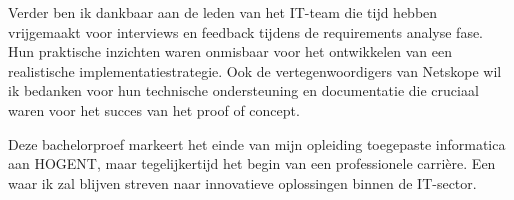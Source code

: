 \vspace{2ex}

Verder ben ik dankbaar aan de leden van het IT-team die tijd hebben vrijgemaakt voor interviews en feedback tijdens de requirements analyse fase. Hun praktische inzichten waren onmisbaar voor het ontwikkelen van een realistische implementatiestrategie. Ook de vertegenwoordigers van Netskope wil ik bedanken voor hun technische ondersteuning en documentatie die cruciaal waren voor het succes van het proof of concept.

\vspace{2ex}

Deze bachelorproef markeert het einde van mijn opleiding toegepaste informatica aan HOGENT, maar tegelijkertijd het begin van een professionele carrière. Een waar ik zal blijven streven naar innovatieve oplossingen binnen de IT-sector.
